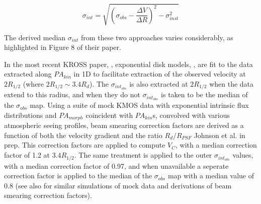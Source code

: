 \documentclass[fleqn,usenatbib]{mn2e}
\begin{document}
\begin{equation}\label{eq:stott_sigma}
   \sigma_{int} = \sqrt{\left(\sigma_{obs} - \frac{\Delta V}{\Delta R}\right)^{2} - \sigma_{inst}^{2}}
\end{equation}

The derived median $\sigma_{int}$ from these two approaches varies considerably, as highlighted in Figure 8 of their paper.

In the most recent KROSS paper, \citep{Harrison2017}, exponential disk models, \cite{Freeman1970}, are fit to the data extracted along $PA_{kin}$ in 1D to facilitate extraction of the observed velocity at $2R_{1/2}$ (where $2R_{1/2} \sim 3.4R_{d}$).
The $\sigma_{int_{obs}}$ is also extracted at $2R_{1/2}$ when the data extend to this radius, and when they do not $\sigma_{int_{obs}}$ is taken to be the median of the $\sigma_{obs}$ map.
Using a suite of mock KMOS data with exponential intrinsic flux distributions and $PA_{morph}$ coincident with $PA_{kin}$s, convolved with various atmospheric seeing profiles, beam smearing correction factors are derived as a function of both the velocity gradient and the ratio $R_{d}/R_{PSF}$ Johnson et al. in prep.
This correction factors are applied to compute $V_{C}$, with a median correction factor of 1.2 at $3.4R_{1/2}$.
The same treatment is applied to the outer $\sigma_{int_{obs}}$ values, with a median correction factor of 0.97, and when unavailable a seperate correction factor is applied to the median of the $\sigma_{obs}$ map with a median value of 0.8 (see also \citep{Burkert2016a} for similar simulations of mock data and derivations of beam smearing correction factors).
\end{document}
